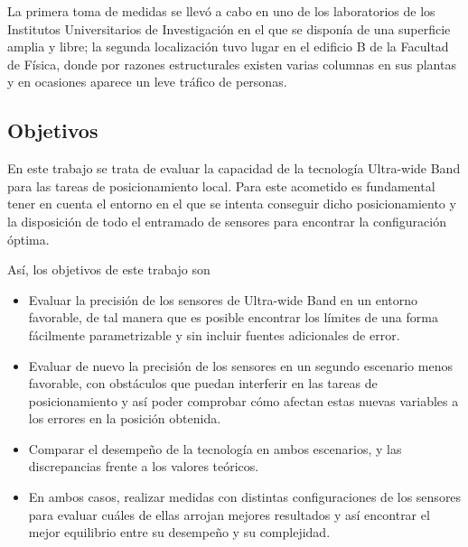 La primera toma de medidas se llevó a cabo en uno de los laboratorios de los Institutos Universitarios de Investigación en el que se disponía de una superficie amplia y libre; la segunda localización tuvo lugar en el edificio B de la Facultad de Física, donde por razones estructurales existen varias columnas en sus plantas y en ocasiones aparece un leve tráfico de personas.

\subsection{Objetivos}
En este trabajo se trata de evaluar la capacidad de la tecnología Ultra-wide Band para las tareas de posicionamiento local.
Para este acometido es fundamental tener en cuenta el entorno en el que se intenta conseguir dicho posicionamiento y la disposición de todo el entramado de sensores para encontrar la configuración óptima.

Así, los objetivos de este trabajo son
\begin{itemize}
    \item Evaluar la precisión de los sensores de Ultra-wide Band en un entorno favorable, de tal manera que es posible encontrar los límites de una forma fácilmente parametrizable y sin incluir fuentes adicionales de error.
    \item Evaluar de nuevo la precisión de los sensores en un segundo escenario menos favorable, con obstáculos que puedan interferir en las tareas de posicionamiento y así poder comprobar cómo afectan estas nuevas variables a los errores en la posición obtenida.
    \item Comparar el desempeño de la tecnología en ambos escenarios, y las discrepancias frente a los valores teóricos.
    \item En ambos casos, realizar medidas con distintas configuraciones de los sensores para evaluar cuáles de ellas arrojan mejores resultados y así encontrar el mejor equilibrio entre su desempeño y su complejidad.
\end{itemize}